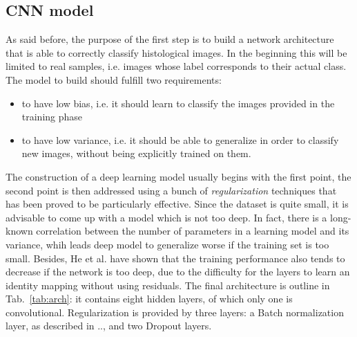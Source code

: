 \documentclass[11pt,twoside,a4paper]{article}
\begin{document}
\subsection{CNN model}
\label{sec:naive_model}
As said before, the purpose of the first step is to build a network architecture that is able to correctly classify histological images. In the beginning this will be limited to real samples, i.e. images whose label corresponds to their actual class.\newline
The model to build should fulfill two requirements:
\begin{itemize}
\item to have low bias, i.e. it should learn to classify the images provided in the training phase
\item to have low variance, i.e. it should be able to generalize in order to classify new images, without being explicitly trained on them.
\end{itemize}
The construction of a deep learning model usually begins with the first point, the second point is then addressed using a bunch of \textit{regularization} techniques that has been proved to be particularly effective.\newline
Since the dataset is quite small, it is advisable to come up with a model which is not too deep. In fact, there is a long-known correlation between the number of parameters in a learning model and its variance, whih leads deep model to generalize worse if the training set is too small. Besides, He et al. have shown that the training performance also tends to decrease if the network is too deep, due to the difficulty for the layers to learn an identity mapping without using residuals.\newline
The final architecture is outline in Tab.~\ref{tab:arch}: it contains eight hidden layers, of which only one is convolutional. Regularization is provided by three layers: a Batch normalization layer, as described in .., and two Dropout layers.
\end{document}
